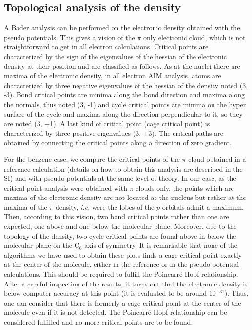 \documentclass[12pt]{article}
\begin{document}
\subsection*{\sffamily \large Topological analysis of the density}
A Bader analysis can be performed on the electronic density obtained with the pseudo potentials.\cite{AIM}
This gives a vision of the $\pi$ only electronic cloud, which is not straightforward to get
in all electron calculations.
Critical points are characterized by the sign of the eigenvalues of the hessian of the electronic density
at their position
and are classified as follows.
As at the nuclei there are maxima of the electronic density, in all electron AIM analysis,
atoms are characterized by three negative eigenvalues
of the hessian of the density noted (3, -3).
Bond critical points are minima along the bond direction and maxima along the normals,
thus noted (3, -1) and cycle critical points are minima on the hyper surface of the cycle
and maxima along the direction perpendicular to it, so they are noted (3, +1).
A last kind of critical point (cage critical point) is characterized by three positive eigenvalues
(3, +3).
The critical paths are obtained by connecting the critical points along a direction of zero gradient.

For the benzene case, we compare the critical points of the $\pi$ cloud 
obtained in a reference calculation (details on how to obtain this analysis are described in the SI)
and with pseudo potentials at the same level of theory.
In our case, as the critical point analysis were obtained
with $\pi$ clouds only, the points which are maxima of the electronic density are not
located at the nucleus but rather at the maxima of the $\pi$ density, \emph{i.e.} were the
lobes of the $p$ orbitals admit a maximum.
Then, according to this vision, two bond critical points rather than one are expected,
one above and one below the molecular plane.
Moreover, due to the topology of the density, two cycle critical points are found above in below the molecular
plane on the C$_6$ axis of symmetry.
It is remarkable that none of the algorithms we have used to obtain these plots finds a cage critical
point exactly at the center of the molecule, either in the reference or in the pseudo potential 
calculations.
This should be required to fulfill the Poincarré-Hopf relationship.
After a careful inspection of the results, it turns out that the electronic density
is below computer accuracy at this point (it is evaluated to be around 10$^{-31}$).
Thus, one can consider that there is formerly a cage critical point at the center of
the molecule even if it is not detected.
The Poincarré-Hopf relationship can be considered fulfilled and no more critical points
are to be found.
\end{document}
